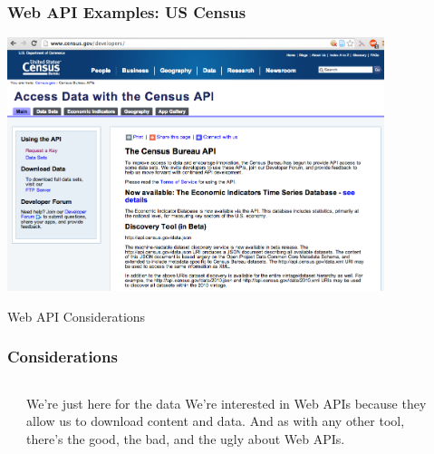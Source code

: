 \documentclass{beamer}\usepackage[]{graphicx}\usepackage[]{color}
\begin{document}
\begin{frame}
\frametitle{Web API Examples: US Census}

\begin{center}
\includegraphics[width=11cm]{images/us_census_api.png}
\end{center}

\end{frame}


\begin{frame}
 \begin{center}
  {\Huge \textcolor{mandarina}{Web API Considerations}}
 \end{center}
\end{frame}


\begin{frame}
\frametitle{Considerations}

\begin{columns}[t]
\begin{column}{0.1\textwidth}
\end{column}
\begin{column}{0.8\textwidth}

\begin{block}{We're just here for the data}
We're interested in Web APIs because they allow us to download content and data. And as with any other tool, there's the good, the bad, and the ugly about Web APIs.
\end{block}

\end{column}
\begin{column}{0.1\textwidth}
\end{column}
\end{columns}

\end{frame}
\end{document}
